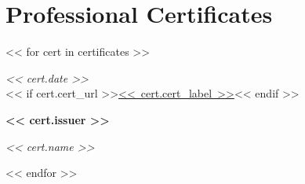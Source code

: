 \section{Professional Certificates}

<< for cert in certificates >>
    \begin{twocolentry}{
    
    \textit{<< cert.date >>}\\
    << if cert.cert_url >>\mbox{\href{<< cert.cert_url >>}{<< cert.cert_label >>}}<< endif >>}
        \textbf{<< cert.issuer >>}
        
        \textit{<< cert.name >>}
    
    \end{twocolentry}
<< endfor >>
